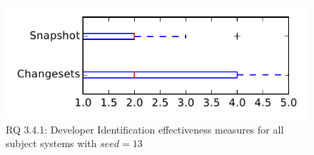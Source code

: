 
\begin{figure}
\centering
\includegraphics[height=0.4\textheight]{figures/dit_seed/rq1_tiny_13}
\caption{RQ 3.4.1: Developer Identification effectiveness measures for all subject systems with $seed=13$}
\label{fig:dit_seed:rq1:tiny}
\end{figure}
